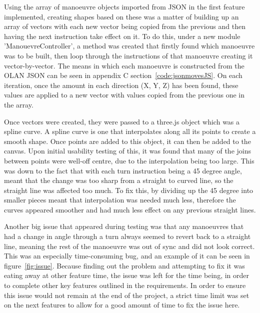 Using the array of manoeuvre objects imported from JSON in the first feature implemented, creating shapes based on these was a matter of building up an array of vectors with each new vector being copied from the previous and then having the next instruction take effect on it. To do this, under a new module 'ManouevreController', a method was created that firstly found which manoeuvre was to be built, then loop through the instructions of that manoeuvre creating it vector-by-vector. The means in which each manoeuvre is constructed from the OLAN JSON can be seen in appendix C section~\ref{code:jsonmovesJS}. On each iteration, once the amount in each direction (X, Y, Z) has been found, these values are applied to a new vector with values copied from the previous one in the array.

Once vectors were created, they were passed to a three.js object which was a spline curve. A spline curve is one that interpolates along all its points to create a smooth shape. Once points are added to this object, it can then be added to the canvas. Upon initial usability testing of this, it was found that many of the joins between points were well-off centre, due to the interpolation being too large. This was down to the fact that with each turn instruction being a 45 degree angle, meant that the change was too sharp from a straight to curved line, so the straight line was affected too much. To fix this, by dividing up the 45 degree into smaller pieces meant that interpolation was needed much less, therefore the curves appeared smoother and had much less effect on any previous straight lines.

Another big issue that appeared during testing was that any manoeuvres that had a change in angle through a turn always seemed to revert back to a straight line, meaning the rest of the manoeuvre was out of sync and did not look correct. This was an especially time-consuming bug, and an example of it can be seen in figure~\ref{fig:issue}. Because finding out the problem and attempting to fix it was eating away at other feature time, the issue was left for the time being, in order to complete other key features outlined in the requirements. In order to ensure this issue would not remain at the end of the project, a strict time limit was set on the next features to allow for a good amount of time to fix the issue here.

